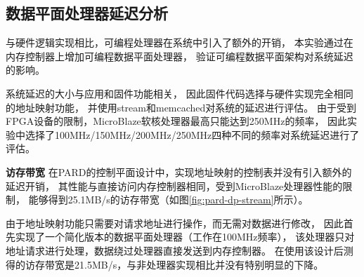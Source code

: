 %


\subsection{数据平面处理器延迟分析}
\label{chap:impl:dp-latency}


与硬件逻辑实现相比，可编程处理器在系统中引入了额外的开销，
本实验通过在内存控制器上增加可编程数据平面处理器，
验证可编程数据平面架构对系统延迟的影响。

系统延迟的大小与应用和固件功能相关，
因此固件代码选择与硬件实现完全相同的地址映射功能，
并使用stream和memcached对系统的延迟进行评估。
由于受到FPGA设备的限制，MicroBlaze软核处理器最高只能达到250MHz的频率，
因此实验中选择了100MHz/150MHz/200MHz/250MHz四种不同的频率对系统延迟进行了评估。

\textbf{访存带宽}\quad
在PARD的控制平面设计中，实现地址映射的控制表并没有引入额外的延迟开销，
其性能与直接访问内存控制器相同，受到MicroBlaze处理器性能的限制，
能够得到25.1MB/s的访存带宽（如图\ref{fig:pard-dp-stream}所示）。

由于地址映射功能只需要对请求地址进行操作，而无需对数据进行修改，
因此首先实现了一个简化版本的数据平面处理器（工作在100MHz频率），
该处理器只对地址请求进行处理，数据绕过处理器直接发送到内存控制器。
在使用该设计后测得的访存带宽是21.5MB/s，与非处理器实现相比并没有特别明显的下降。

